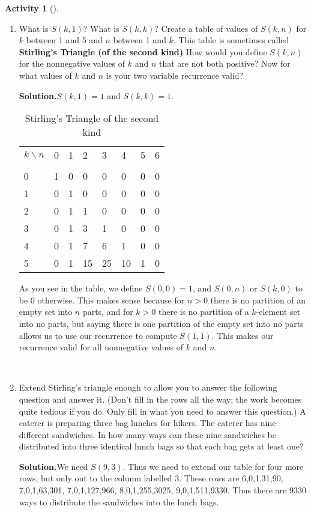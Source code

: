 \documentclass[10pt,]{book}
\newcommand{\terminology}[1]{\textbf{#1}}
\theoremstyle{plain}
\theoremstyle{definition}
\newtheorem{activity}[project]{Activity}
\numberwithin{equation}{chapter}
\newcommand{\hrulethin}  {\noalign{\hrule height 0.04em}}
\begin{document}
\begin{activity}[]
\begin{enumerate}[label=(\alph*)]
~\par
\item What is \(S(k,1)\)? What is \(S(k,k)\)? Create a table of values of \(S(k,n)\) for \(k\) between 1 and 5 and \(n\) between 1 and \(k\). This table is sometimes called \terminology{Stirling's Triangle (of the second kind)} How would you define \(S(k,n)\) for the nonnegative values of \(k\) and \(n\) that are not both positive? Now for what values of \(k\) and \(n\) is your two variable recurrence valid?%
\par\medskip\noindent%
\textbf{Solution.}\quad \(S(k,1)=1\) and \(S(k,k)=1\).%
\begin{table}
\centering
\begin{tabular}{llllllll}
\(k\backslash n\)&0&1&2&3&4&5&6\tabularnewline[0pt]
&&&&&&&\tabularnewline\hrulethin
0&1&0&0&0&0&0&0\tabularnewline[0pt]
1&0&1&0&0&0&0&0\tabularnewline[0pt]
2&0&1&1&0&0&0&0\tabularnewline[0pt]
3&0&1&3&1&0&0&0\tabularnewline[0pt]
4&0&1&7&6&1&0&0\tabularnewline[0pt]
5&0&1&15&25&10&1&0
\end{tabular}
\caption{Stirling's Triangle of the second kind\label{stirling-triangle-second}}
\end{table}
As you see in the table, we define \(S(0,0)=1\), and \(S(0,n)\) or \(S(k,0)\) to be 0 otherwise. This makes sense because for \(n>0\) there is no partition of an empty set into \(n\) parts, and for \(k>0\) there is no partition of a \(k\)-element set into no parts, but saying there is one partition of the empty set into no parts allows us to use our recurrence to compute \(S(1,1)\).  This makes our recurrence valid for all nonnegative values of \(k\) and \(n\).%

~\par
\item Extend Stirling's triangle enough to allow you to answer the following question and answer it. (Don't fill in the rows all the way; the work becomes quite tedious if you do. Only fill in what you need to answer this question.) A caterer is preparing three bag lunches for hikers. The caterer has nine different sandwiches. In how many ways can these nine sandwiches be distributed into three identical lunch bags so that each bag gets at least one?%
\par\medskip\noindent%
\textbf{Solution.}\quad We need \(S(9,3)\). Thus we need to extend our table for four more rows, but only out to the column labelled 3. These rows are 6,0,1,31,90, 7,0,1,63,301, 7,0,1,127,966, 8,0,1,255,3025, 9,0,1,511,9330. Thus there are 9330 ways to distribute the sandwiches into the lunch bags.%


\end{enumerate}
\end{activity}
\end{document}
